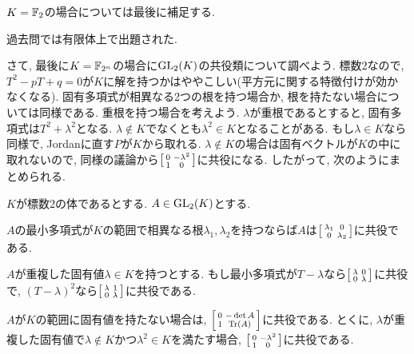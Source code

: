 $K=\mathbb{F}_{2}$の場合については最後に補足する.


過去問では有限体上で出題された.
\begin{egprob}

\end{egprob}

\begin{egans}
\end{egans}
さて, 最後に$K=\mathbb{F}_{2^n}$の場合に$\mathrm{GL}_{2}(K)$の共役類について調べよう. 標数2なので, $T^2 - pT + q=0$が$K$に解を持つかはややこしい(平方元に関する特徴付けが効かなくなる). 固有多項式が相異なる2つの根を持つ場合か, 根を持たない場合については同様である. 重根を持つ場合を考えよう. $\lambda$が重根であるとすると, 固有多項式は$T^2 + \lambda^2$となる. $\lambda\notin K$でなくとも$\lambda^2 \in K$となることがある. もし$\lambda\in K$なら同様で, Jordanに直す$P$が$K$から取れる. $\lambda\notin K$の場合は固有ベクトルが$K$の中に取れないので, 同様の議論から$\left[\begin{smallmatrix}0 & - \lambda^2 \\ 1 & 0\end{smallmatrix}\right]$に共役になる. したがって, 次のようにまとめられる.

\begin{prop} $K$が標数2の体であるとする. $A\in \mathrm{GL}_{2}(K)$とする.
\ben
\item $A$の最小多項式が$K$の範囲で相異なる根$\lambda_1,\lambda_2$を持つならば$A$は$\left[\begin{smallmatrix}\lambda_1 & 0 \\ 0 & \lambda_2\end{smallmatrix}\right]$に共役である.
\item  $A$が重複した固有値$\lambda\in K$を持つとする. もし最小多項式が$T-\lambda$なら$\left[\begin{smallmatrix}\lambda & 0 \\ 0 & \lambda\end{smallmatrix}\right]$に共役で, $(T-\lambda)^2$なら$\left[\begin{smallmatrix}\lambda & 1 \\ 0 & \lambda\end{smallmatrix}\right]$に共役である.
\item $A$が$K$の範囲に固有値を持たない場合は, $\left[\begin{smallmatrix}0 & -\det{A} \\ 1 & \mathrm{Tr}\left( A \right)\end{smallmatrix}\right]$に共役である. とくに, $\lambda$が重複した固有値で$\lambda\notin K$かつ$\lambda^2 \in K$を満たす場合, $\left[\begin{smallmatrix}0 & -\lambda^2 \\ 1 & 0\end{smallmatrix}\right]$に共役である.
\een

\end{prop}



